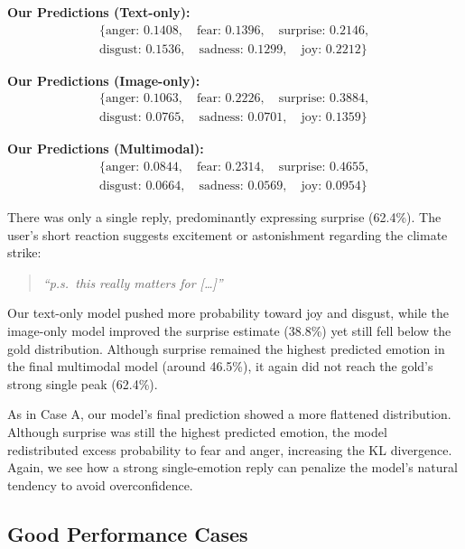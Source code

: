 \noindent\textbf{Our Predictions (Text-only):}
\[
\begin{aligned}
\{\text{anger: } 0.1408, \quad \text{fear: } 0.1396, \quad \text{surprise: } 0.2146, \\
\text{disgust: } 0.1536, \quad \text{sadness: } 0.1299, \quad \text{joy: } 0.2212\}
\end{aligned}
\]

\noindent\textbf{Our Predictions (Image-only):}
\[
\begin{aligned}
\{\text{anger: } 0.1063, \quad \text{fear: } 0.2226, \quad \text{surprise: } 0.3884, \\
\text{disgust: } 0.0765, \quad \text{sadness: } 0.0701, \quad \text{joy: } 0.1359\}
\end{aligned}
\]

\noindent\textbf{Our Predictions (Multimodal):}
\[
\begin{aligned}
\{\text{anger: } 0.0844, \quad \text{fear: } 0.2314, \quad \text{surprise: } 0.4655, \\
\text{disgust: } 0.0664, \quad \text{sadness: } 0.0569, \quad \text{joy: } 0.0954\}
\end{aligned}
\]

There was only a single reply, predominantly expressing surprise (62.4\%). The user’s short reaction suggests excitement or astonishment regarding the climate strike:
\begin{quote}
\emph{``p.s.\ this really matters for [\dots]''}
\end{quote}

Our text-only model pushed more probability toward joy and disgust, while the image-only model improved the surprise estimate (38.8\%) yet still fell below the gold distribution. Although surprise remained the highest predicted emotion in the final multimodal model (around 46.5\%), it again did not reach the gold’s strong single peak (62.4\%). 
\newline

As in Case A, our model’s final prediction showed a more flattened distribution. Although surprise was still the highest predicted emotion, the model redistributed excess probability to fear and anger, increasing the KL divergence. Again, we see how a strong single-emotion reply can penalize the model’s natural tendency to avoid overconfidence.

\subsection*{Good Performance Cases}

